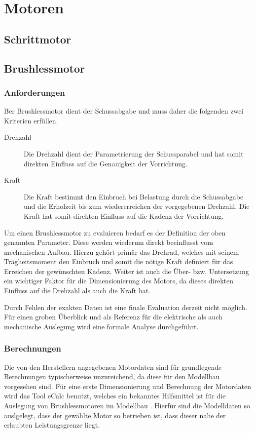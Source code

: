 \section{Motoren} \label{sec:motors}

\subsection{Schrittmotor}

\subsection{Brushlessmotor}

\subsubsection{Anforderungen}
Ber Brushlessmotor dient der Schussabgabe und muss daher die folgenden
zwei Kriterien erfüllen.

\begin{description}
	\item[Drehzahl]
		Die Drehzahl dient der Parametrierung der Schussparabel
		und hat somit direkten Einfluss auf die Genauigkeit der
		Vorrichtung.
	\item[Kraft]
		Die Kraft bestimmt den Einbruch bei Belastung durch die
		Schussabgabe und die Erholzeit bis zum wiedererreichen
		der vorgegebenen Drehzahl. Die Kraft hat somit direkten
		Einfluss auf die Kadenz der Vorrichtung.
\end{description}

Um einen Brushlessmotor zu evaluieren bedarf es der Definition der oben
genannten Parameter. Diese werden wiederum direkt beeinflusst vom 
mechanischen Aufbau. Hierzu gehört primär das Drehrad, welches mit seinem
Trägheitsmoment den Einbruch und somit die nötige Kraft definiert für das
Erreichen der gewünschten Kadenz. Weiter ist auch die Über- bzw.
Untersetzung ein wichtiger Faktor für die Dimensionierung des Motors, da
dieses direkten Einfluss auf die Drehzahl als auch die Kraft hat.

Durch Fehlen der exakten Daten ist eine finale Evaluation derzeit nicht
möglich. Für einen groben Überblick und als Referenz für die elektrische
als auch mechanische Auslegung wird eine formale Analyse durchgeführt.

\subsubsection{Berechnungen}
Die von den Herstellern angegebenen Motordaten sind für grundlegende
Berechnungen typischerweise unzureichend, da diese für den Modellbau
vorgesehen sind. Für eine erste Dimensionierung und Berechnung der
Motordaten wird das Tool eCalc benutzt, welches ein bekanntes
Hilfsmittel ist für die Auslegung von Brushlessmotoren im Modellbau
\cite{ecalc}. Hierfür sind die Modelldaten so auslgelegt, dass der
gewählte Motor so betrieben ist, dass dieser nahe der erlaubten
Leistungsgrenze liegt.

